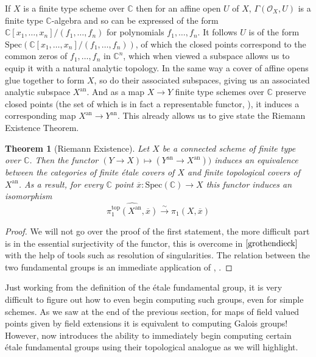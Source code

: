 \documentclass{article}
\newtheorem{theorem}{Theorem}[section]
\theoremstyle{definition}
\theoremstyle{remark}
\newcommand{\C}{\mathbb{C}}
\newcommand{\mc}[1]{\mathcal{#1}}
\begin{document}
\indent If $X$ is a finite type scheme over $\C$ then for an affine open $U$ of $X$, $\Gamma(\mc{O}_X, U)$ is a finite type $\C$-algebra and so can be expressed of the form $\C[x_1, \dots, x_n]/(f_1, \dots, f_n)$ for polynomials $f_1, \dots, f_n$.
It follows $U$ is of the form $\text{Spec}(\C[x_1, \dots, x_n]/(f_1, \dots, f_n))$, of which the closed points correspond to the common zeros of $f_1, \dots, f_n$ in $\C^n$, which when viewed a subspace allows us to equip it with a natural analytic topology.
In the same way a cover of affine opens glue together to form $X$, so do their associated subspaces, giving us an associated analytic subspace $X^{\text{an}}$.
And as a map $X \to Y$ finite type schemes over $\C$ preserve closed points (the set of which is in fact a representable functor, ), it induces a corresponding map $X^{\text{an}} \to Y^{\text{an}}$.
This already allows us to give state the Riemann Existence Theorem.


\begin{theorem}[Riemann Existence]
	Let $X$ be a connected scheme of finite type over $\C$.
	Then the functor $(Y \to X) \mapsto (Y^{\text{an}} \to X^{\text{an}}))$ induces an equivalence between the categories of finite \'etale covers of $X$ and finite topological covers of $X^{\text{an}}$.
	As a result, for every $\C$ point $\overline{x}: \text{Spec}(\C) \to X$ this functor induces an isomorphism
	\[\widehat{\pi_1^{\text{top}}(X^{\text{an}}, \overline{x})} \xrightarrow{\sim} \pi_1(X, \overline{x})\]
\end{theorem}

\begin{proof}
	We will not go over the proof of the first statement, the more difficult part is in the essential surjectivity of the functor, this is overcome in $\cite{grothendieck}$ with the help of tools such as resolution of singularities.
	The relation between the two fundamental groups is an immediate application of , .
\end{proof}

Just working from the definition of the \'etale fundamental group, it is very difficult to figure out how to even begin computing such groups, even for simple schemes. 
As we saw at the end of the previous section, for maps of field valued points given by field extensions it is equivalent to computing Galois groups!
However,  now introduces the ability to immediately begin computing certain \'etale fundamental groups using their topological analogue as we will highlight.
\end{document}
